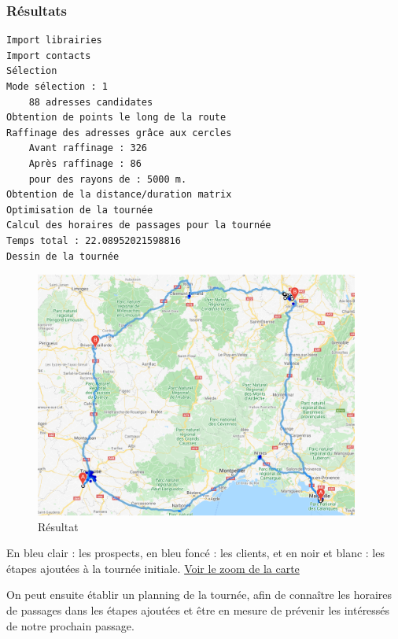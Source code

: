 \documentclass[12pt]{article}
\begin{document}
\newpage

\subsubsection{Résultats}

\begin{verbatim}
Import librairies
Import contacts
Sélection
Mode sélection : 1
	88 adresses candidates
Obtention de points le long de la route 
Raffinage des adresses grâce aux cercles 
	Avant raffinage : 326
	Après raffinage : 86
	pour des rayons de : 5000 m.
Obtention de la distance/duration matrix
Optimisation de la tournée
Calcul des horaires de passages pour la tournée
Temps total : 22.08952021598816
Dessin de la tournée
\end{verbatim}

\begin{figure}[H]
\caption{Résultat}
\begin{center}
\includegraphics[width=0.95\textwidth]{completion final}
\end{center}
\end{figure}

En bleu clair : les prospects, en bleu foncé : les clients, et en noir et blanc : les étapes ajoutées à la tournée initiale.
\hyperlink{Ref5}{Voir le zoom de la carte}
\hypertarget{Ref6}{}

\newpage


On peut ensuite établir un planning de la tournée, afin de connaître les horaires de passages dans les étapes ajoutées et être en mesure de prévenir les intéressés de notre prochain passage.
\end{document}
